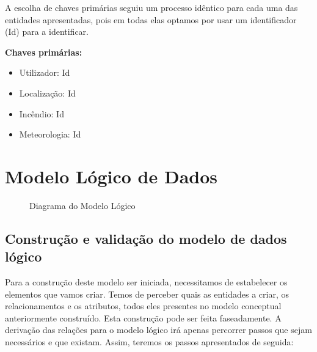 \documentclass[a4paper,12pt]{scrreprt}
\begin{document}
A escolha de chaves primárias seguiu um processo idêntico para cada uma das entidades apresentadas, pois em todas elas optamos por usar um identificador (Id) para a identificar.

\textbf{Chaves primárias:}

\begin{itemize}
    \item Utilizador: Id
    \item Localização: Id
    \item Incêndio: Id
    \item Meteorologia: Id
\end{itemize}

\section{Modelo Lógico de Dados}

\begin{figure}[H]
    \centering
    \caption{Diagrama do Modelo Lógico}
\end{figure}

\subsection{Construção e validação do modelo de dados lógico}

Para a construção deste modelo ser iniciada, necessitamos de estabelecer os elementos que vamos criar. Temos de perceber quais as entidades a criar, os relacionamentos e os atributos, todos eles presentes no modelo conceptual anteriormente construído. Esta construção pode ser feita faseadamente. A derivação das relações para o modelo lógico irá apenas percorrer passos que sejam necessários e que existam. Assim, teremos os passos apresentados de seguida:
\end{document}
